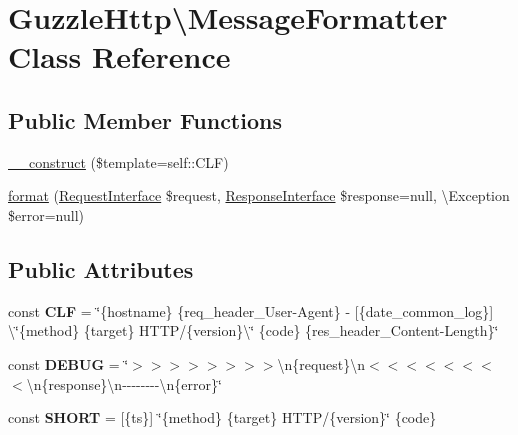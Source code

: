 \hypertarget{classGuzzleHttp_1_1MessageFormatter}{}\section{Guzzle\+Http\textbackslash{}Message\+Formatter Class Reference}
\label{classGuzzleHttp_1_1MessageFormatter}
\subsection*{Public Member Functions}
\begin{DoxyCompactItemize}
\item 
\hyperlink{classGuzzleHttp_1_1MessageFormatter_a54d3d755b2aaaf0343bb2c9d8f0b71f0}{\+\_\+\+\_\+construct} (\$template=self\+::\+C\+LF)
\item 
\hyperlink{classGuzzleHttp_1_1MessageFormatter_a164dee7fed72177bca6288bac0d6736d}{format} (\hyperlink{interfacePsr_1_1Http_1_1Message_1_1RequestInterface}{Request\+Interface} \$request, \hyperlink{interfacePsr_1_1Http_1_1Message_1_1ResponseInterface}{Response\+Interface} \$response=null, \textbackslash{}Exception \$error=null)
\end{DoxyCompactItemize}
\subsection*{Public Attributes}
\begin{DoxyCompactItemize}
\item 
\mbox{\label{classGuzzleHttp_1_1MessageFormatter_a0149d558197521c8d4c2cbf1f7663ffb}} 
const {\bfseries C\+LF} = \char`\"{}\{hostname\} \{req\+\_\+header\+\_\+\+User-\/Agent\} -\/ \mbox{[}\{date\+\_\+common\+\_\+log\}\mbox{]} \textbackslash{}\char`\"{}\{method\} \{target\} H\+T\+TP/\{version\}\textbackslash{}\char`\"{} \{code\} \{res\+\_\+header\+\_\+\+Content-\/Length\}\char`\"{}
\item 
\mbox{\label{classGuzzleHttp_1_1MessageFormatter_aa716b1322f171ee59945a2eef707819e}} 
const {\bfseries D\+E\+B\+UG} = \char`\"{}$>$$>$$>$$>$$>$$>$$>$$>$\textbackslash{}n\{request\}\textbackslash{}n$<$$<$$<$$<$$<$$<$$<$$<$\textbackslash{}n\{response\}\textbackslash{}n-\/-\/-\/-\/-\/-\/-\/-\/\textbackslash{}n\{error\}\char`\"{}
\item 
\mbox{\label{classGuzzleHttp_1_1MessageFormatter_ab54b212f921a0b0d24efbb3fa43a019a}} 
const {\bfseries S\+H\+O\+RT} = \textquotesingle{}\mbox{[}\{ts\}\mbox{]} \char`\"{}\{method\} \{target\} H\+T\+TP/\{version\}\char`\"{} \{code\}\textquotesingle{}
\end{DoxyCompactItemize}


